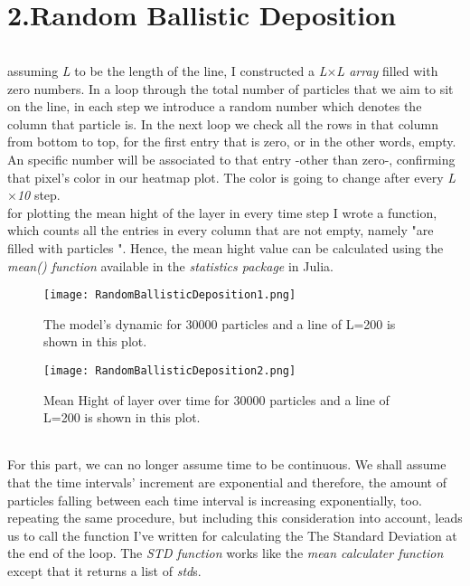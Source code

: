 \documentclass[12pt,a4paper]{article}
\begin{document}
\part*{2.Random Ballistic Deposition}
\paragraph*{}
	assuming \textit{L} to be the length of the line, I constructed a \textit{L$\times$L array} filled with zero numbers. In a loop through the total number of particles that we aim to sit on the line, in each step we introduce a random number which denotes the column that particle is. In the next loop we check all the rows in that column from bottom to top, for the first entry that is zero, or in the other words, empty. An specific number will be associated to that entry -other than zero-, confirming that pixel's color in our heatmap plot. The color is going to change after every \textit{L$\times$10} step. 
	\\ for plotting the mean hight of the layer in every time step I wrote a function, which counts all the entries in every column that are not empty, namely "are filled with particles ". Hence, the mean hight value can be calculated using the \textit{mean() function} available in the \textit{statistics package} in Julia. 
\begin{figure}[H]
	\centering
	\texttt{[image: RandomBallisticDeposition1.png]}
	\label{fig:mesh2}
	\caption{The model's dynamic for 30000 particles and a line of L=200 is shown in this plot.}
\end{figure}
\begin{figure}[H]
	\centering
	\texttt{[image: RandomBallisticDeposition2.png]}
	\label{fig:mesh3}
	\caption{Mean Hight of layer over time for 30000 particles and a line of L=200 is shown in this plot.}
\end{figure}



\paragraph*{} For this part, we can no longer assume time to be continuous. We shall assume that the time intervals' increment are exponential and therefore, the amount of particles falling between each time interval is increasing exponentially, too. repeating the same procedure, but including this consideration into account, leads us to call the function I've written for calculating the The Standard Deviation at the end of the loop. The \textit{STD function} works like the \textit{mean\underline{\hspace{.08in}} calculater function} except that it returns a list of \textit{std}s.
\end{document}
